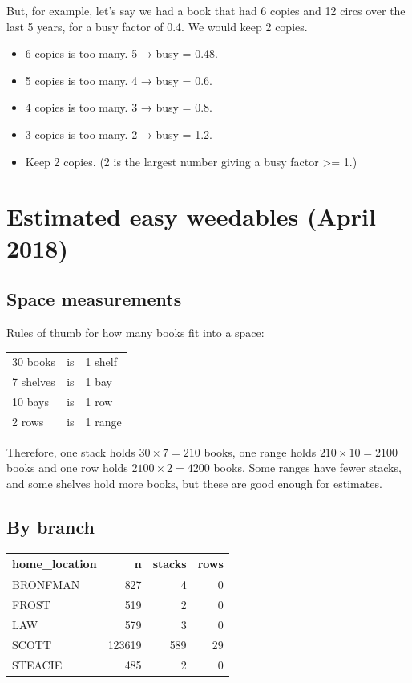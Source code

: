 \documentclass[11pt]{article}
\begin{document}
But, for example, let's say we had a book that had 6 copies and 12 circs over the last 5 years, for a busy factor of 0.4.  We would keep 2 copies.

\begin{itemize}
\item 6 copies is too many.  5 → busy = 0.48.
\item 5 copies is too many.  4 → busy = 0.6.
\item 4 copies is too many.  3 → busy = 0.8.
\item 3 copies is too many.  2 → busy = 1.2.
\item Keep 2 copies.  (2 is the largest number giving a busy factor >= 1.)
\end{itemize}

\section*{Estimated easy weedables (April 2018)}
\label{sec:orgf71a00f}

\subsection*{Space measurements}
\label{sec:orge4d11eb}

Rules of thumb for how many books fit into a space:

\begin{center}
\begin{tabular}{lll}
30 books & is & 1 shelf\\
7 shelves & is & 1 bay\\
10 bays & is & 1 row\\
2 rows & is & 1 range\\
\end{tabular}
\end{center}

Therefore, one stack holds \(30 \times 7 = 210\) books, one range holds \(210 \times 10 = 2100\) books and one row holds \(2100 \times 2 = 4200\) books.  Some ranges have fewer stacks, and some shelves hold more books, but these are good enough for estimates.

\subsection*{By branch}
\label{sec:org7163318}

\begin{center}
\begin{tabular}{lrrr}
home\_location & n & stacks & rows\\
\hline
BRONFMAN & 827 & 4 & 0\\
FROST & 519 & 2 & 0\\
LAW & 579 & 3 & 0\\
SCOTT & 123619 & 589 & 29\\
STEACIE & 485 & 2 & 0\\
\end{tabular}
\end{center}
\end{document}
